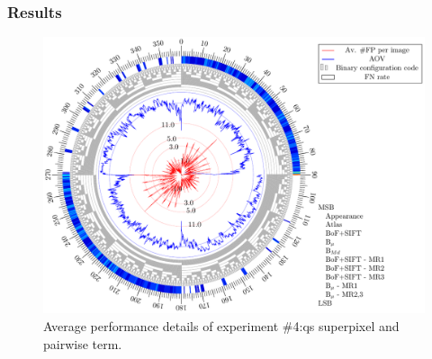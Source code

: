 \begin{frame}[plain]\frametitle{Results}
\begin{figure}[Htbp]
\centering
\includegraphics[height=.85\textheight]{roses/discresultsQS.pdf}
\caption{Average performance details of experiment \#4:\ac{qs} superpixel and pairwise term.}%
\end{figure}
\end{frame}

